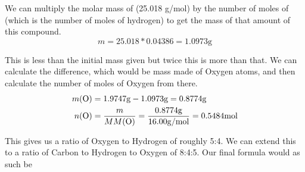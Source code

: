 \documentclass[10pt]{article}
\begin{document}
            We can multiply the molar mass of  (25.018 \unit{\gram/\mole}) by the number of moles of  (which is the number of moles of hydrogen) to get the mass of that amount of this compound.
            \begin{equation}
                m   =   25.018 * 0.04386    =   1.0973 \unit{\gram}
            \end{equation}

            This is less than the initial mass given but twice this is more than that.
            We can calculate the difference, which would be mass made of Oxygen atoms, and then calculate the number of moles of Oxygen from there.
            \begin{align}
                m(\ce{O})   &=  1.9747 \unit{\gram} - 1.0973 \unit{\gram}
                    =   0.8774 \unit{\gram}\\
                n(\ce{O})   &=  \frac{m}{MM(\ce{O})}
                    =   \frac{0.8774\unit{\gram}}{16.00\unit{\gram/\mole}}
                    =   0.5484 \unit{\mole}
            \end{align}

            This gives us a ratio of Oxygen to Hydrogen of roughly 5:4.
            We can extend this to a ratio of Carbon to Hydrogen to Oxygen of 8:4:5.
            Our final formula would as such be 
\end{document}
